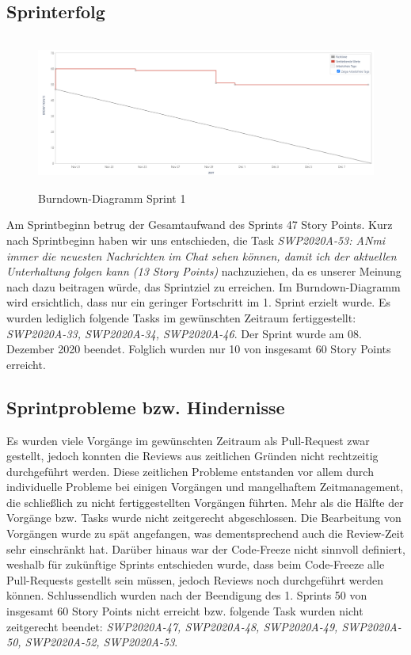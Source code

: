 \documentclass[12pt,a4paper, oneside]{article}
\begin{document}
    \subsection{Sprinterfolg}

    \begin{figure}[h]
        \centering
        \includegraphics[width=\textwidth, height=5cm]{img/sprint_01/Burndown-Sprint1.PNG}
        \caption{Burndown-Diagramm Sprint 1}
        \label{fig: Burndown-Sprint1}
    \end{figure}

    \noindent
    Am Sprintbeginn betrug der Gesamtaufwand des Sprints 47 Story Points. Kurz nach Sprintbeginn haben wir uns entschieden, die Task \textit{SWP2020A-53: ANmi immer die neuesten Nachrichten im Chat sehen können, damit ich der aktuellen Unterhaltung folgen kann (13 Story Points)} nachzuziehen, da es unserer Meinung nach dazu beitragen würde, das Sprintziel zu erreichen. Im Burndown-Diagramm wird ersichtlich, dass nur ein geringer Fortschritt im 1. Sprint erzielt wurde. Es wurden lediglich folgende Tasks im gewünschten Zeitraum fertiggestellt: \textit{SWP2020A-33, SWP2020A-34, SWP2020A-46}. Der Sprint wurde am 08. Dezember 2020 beendet. Folglich wurden nur 10 von insgesamt 60 Story Points erreicht.

    \subsection{Sprintprobleme bzw. Hindernisse}
    Es wurden viele Vorgänge im gewünschten Zeitraum als Pull-Request zwar gestellt, jedoch konnten die Reviews aus zeitlichen Gründen nicht rechtzeitig durchgeführt werden. Diese zeitlichen Probleme entstanden vor allem durch individuelle Probleme bei einigen Vorgängen und mangelhaftem Zeitmanagement, die schließlich zu nicht fertiggestellten Vorgängen führten. Mehr als die Hälfte der Vorgänge bzw. Tasks wurde nicht zeitgerecht abgeschlossen. Die Bearbeitung von Vorgängen wurde zu spät angefangen, was dementsprechend auch die Review-Zeit sehr einschränkt hat. Darüber hinaus war der Code-Freeze nicht sinnvoll definiert, weshalb für zukünftige Sprints entschieden wurde, dass beim Code-Freeze alle Pull-Requests gestellt sein müssen, jedoch Reviews noch durchgeführt werden können. Schlussendlich wurden nach der Beendigung des 1. Sprints 50 von insgesamt 60 Story Points nicht erreicht bzw. folgende Task wurden nicht zeitgerecht beendet: \textit{SWP2020A-47, SWP2020A-48, SWP2020A-49, SWP2020A-50, SWP2020A-52, SWP2020A-53}.
\end{document}

